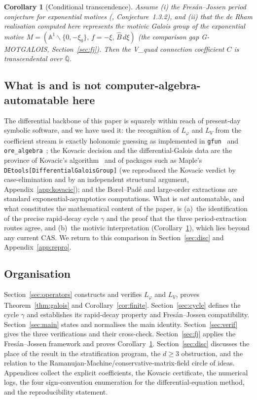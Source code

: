 \documentclass[11pt,reqno]{amsart}
\theoremstyle{plain}
\newtheorem{corollary}[theorem]{Corollary}
\theoremstyle{definition}
\newcommand{\Bhat}{\widehat{B}}
\newcommand{\Lphi}{L_{\varphi}}
\newcommand{\LV}{L_{V}}
\newcommand{\Qbar}{\overline{\mathbb{Q}}}
\newcommand{\xizero}{\xi_0}
\providecommand{\C}{}\renewcommand{\C}{C}
\begin{document}
\begin{corollary}[Conditional transcendence]\label{cor:transc}
Assume \emph{(i)} the Fres\'an--Jossen period conjecture for exponential motives
\textup{(\cite{FJ}, Conjecture~1.3.2)}, and \emph{(ii)} that the de Rham realisation computed
here represents the motivic Galois group of the exponential motive
$M=(\mathbb{A}^1\smallsetminus\{0,-\xizero\},\,f=-\xi,\,\Bhat\,d\xi)$ \textup{(the comparison
gap G-MOTGALOIS, Section~\ref{sec:fj})}. Then the V\_quad connection coefficient $\C$ is
transcendental over $\Qbar$.
\end{corollary}

\subsection{What is and is not computer-algebra-automatable here}
The differential backbone of this paper is squarely within reach of present-day symbolic
software, and we have used it: the recognition of $\Lphi$ and $\LV$ from the coefficient stream
is exactly holonomic guessing as implemented in \texttt{gfun}~\cite{gfun} and
\texttt{ore\_algebra}~\cite{oreAlgebra}; the Kovacic decision and the differential-Galois data
are the province of Kovacic's algorithm~\cite{Kovacic} and of packages such as Maple's
\texttt{DEtools[DifferentialGaloisGroup]} (we reproduced the Kovacic verdict by case-elimination
and by an independent structural argument, Appendix~\ref{app:kovacic}); and the Borel--Pad\'e
and large-order extractions are standard exponential-asymptotics computations. What is
\emph{not} automatable, and what constitutes the mathematical content of the paper, is
(a)~the identification of the precise rapid-decay cycle $\gamma$ and the proof that the three
period-extraction routes agree, and (b)~the motivic interpretation
(Corollary~\ref{cor:transc}), which lies beyond any current CAS. We return to this comparison
in Section~\ref{sec:disc} and Appendix~\ref{app:repro}.

\subsection{Organisation}
Section~\ref{sec:operators} constructs and verifies $\Lphi$ and $\LV$, proves
Theorem~\ref{thm:galois} and Corollary~\ref{cor:finite}. Section~\ref{sec:cycle} defines the
cycle $\gamma$ and establishes its rapid-decay property and Fres\'an--Jossen compatibility.
Section~\ref{sec:main} states and normalises the main identity. Section~\ref{sec:verif} gives
the three verifications and their cross-check. Section~\ref{sec:fj} applies the
Fres\'an--Jossen framework and proves Corollary~\ref{cor:transc}.
Section~\ref{sec:disc} discusses the place of the result in the stratification program, the
$d\ge3$ obstruction, and the relation to the Ramanujan-Machine/conservative-matrix-field
circle of ideas. Appendices collect the explicit coefficients, the Kovacic certificate, the
numerical logs, the four sign-convention enumeration for the differential-equation method, and
the reproducibility statement.
\end{document}
